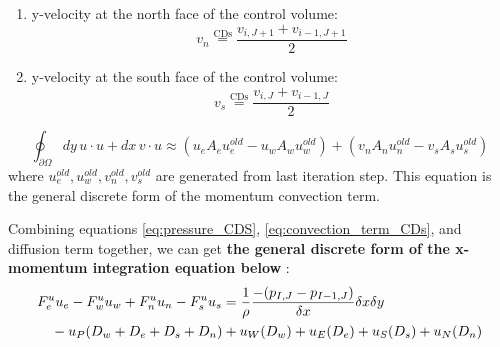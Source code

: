 \documentclass[12pt]{article}
\theoremstyle{plain}  %
\theoremstyle{definition}  %
\begin{document}
\begin{enumerate}
\begin{enumerate}[label=(\arabic*)]
\begin{equation}
      u_{w} \overset{\text{CDs}}{=} \frac{u_{P} + u_{W}}{2} = \frac{u_{i,J} + u_{i-1,J}}{2}
    \end{equation}
    \item y-velocity at the north face of the control volume:
    \begin{equation}
      v_{n} \overset{\text{CDs}}{=} \frac{v_{i,J+1} + v_{i-1,J+1}}{2}
    \end{equation}
    \item y-velocity at the south face of the control volume:
    \begin{equation}
      v_{s} \overset{\text{CDs}}{=} \frac{v_{i,J} + v_{i-1,J}}{2}
    \end{equation}
  \end{enumerate}
  \begin{equation}
    \label{eq:convection_term_CDs}
    \oint_{\partial \Omega} dy \, u \cdot u + dx \, v \cdot u \approx 
    (u_{e}A_{e}u_{e}^{old} - u_{w}A_{w}u_{w}^{old}) + (v_{n}A_{n}u_{n}^{old} - v_{s}A_{s}u_{s}^{old})
  \end{equation}
  where $u_{e}^{old}, u_{w}^{old}, v_{n}^{old}, v_{s}^{old}$ are generated from last iteration step. This equation is the general discrete form of the momentum convection term.
\end{enumerate}
\noindent Combining equations \eqref{eq:pressure_CDS}, \eqref{eq:convection_term_CDs}, and diffusion term together, we can get \textbf{the general discrete form of the x-momentum integration equation below} :
\begin{align}
&F_e^u u_e - F_w^u u_w + F_n^u u_n - F_s^u u_s = \frac{1}{\rho} \frac{-(p_{I,J} - p_{I-1,J})}{\delta x} \delta x \delta y \notag \\
&\quad -u_P (D_w + D_e + D_s + D_n) + u_W (D_w) + u_E (D_e) + u_S (D_s) + u_N (D_n)
\end{align}
\end{document}
